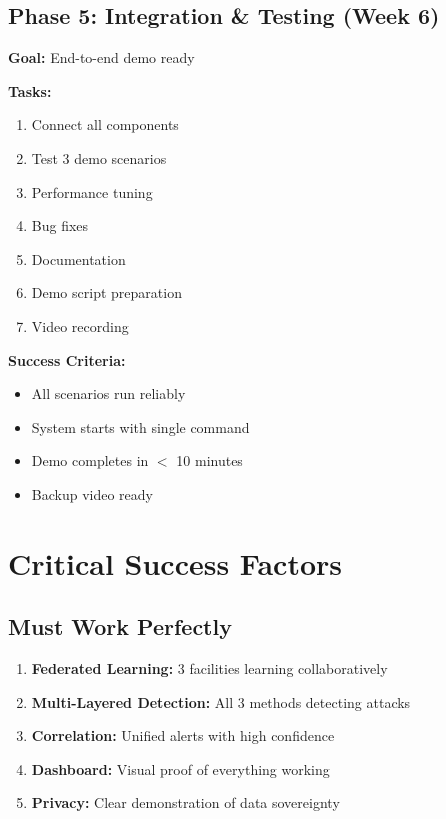 \documentclass[12pt,a4paper]{article}
\begin{document}
\subsection{Phase 5: Integration \& Testing (Week 6)}

\textbf{Goal:} End-to-end demo ready

\textbf{Tasks:}
\begin{enumerate}[leftmargin=1cm,itemsep=0pt]
    \item Connect all components
    \item Test 3 demo scenarios
    \item Performance tuning
    \item Bug fixes
    \item Documentation
    \item Demo script preparation
    \item Video recording
\end{enumerate}

\textbf{Success Criteria:}
\begin{itemize}[leftmargin=1cm,itemsep=0pt]
    \item All scenarios run reliably
    \item System starts with single command
    \item Demo completes in $<$ 10 minutes
    \item Backup video ready
\end{itemize}

\section{Critical Success Factors}

\subsection{Must Work Perfectly}

\begin{enumerate}[leftmargin=1cm,itemsep=0pt]
    \item \textbf{Federated Learning:} 3 facilities learning collaboratively
    \item \textbf{Multi-Layered Detection:} All 3 methods detecting attacks
    \item \textbf{Correlation:} Unified alerts with high confidence
    \item \textbf{Dashboard:} Visual proof of everything working
    \item \textbf{Privacy:} Clear demonstration of data sovereignty
\end{enumerate}
\end{document}
